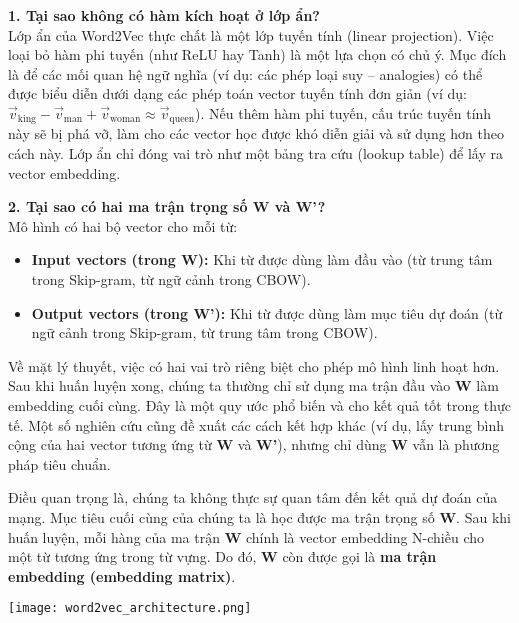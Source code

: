\begin{tcolorbox}[
    title=Ghi chú về Thiết kế Kiến trúc,
    colback=green!5!white, colframe=green!50!black, fonttitle=\bfseries
]
\textbf{1. Tại sao không có hàm kích hoạt ở lớp ẩn?} \\
Lớp ẩn của Word2Vec thực chất là một lớp tuyến tính (linear projection). Việc loại bỏ hàm phi tuyến (như ReLU hay Tanh) là một lựa chọn có chủ ý. Mục đích là để các mối quan hệ ngữ nghĩa (ví dụ: các phép loại suy -- analogies) có thể được biểu diễn dưới dạng các phép toán vector tuyến tính đơn giản (ví dụ: $\vec{v}_{\text{king}} - \vec{v}_{\text{man}} + \vec{v}_{\text{woman}} \approx \vec{v}_{\text{queen}}$). Nếu thêm hàm phi tuyến, cấu trúc tuyến tính này sẽ bị phá vỡ, làm cho các vector học được khó diễn giải và sử dụng hơn theo cách này. Lớp ẩn chỉ đóng vai trò như một bảng tra cứu (lookup table) để lấy ra vector embedding.

\textbf{2. Tại sao có hai ma trận trọng số W và W'?} \\
Mô hình có hai bộ vector cho mỗi từ:
\begin{itemize}
    \item \textbf{Input vectors (trong W):} Khi từ được dùng làm đầu vào (từ trung tâm trong Skip-gram, từ ngữ cảnh trong CBOW).
    \item \textbf{Output vectors (trong W'):} Khi từ được dùng làm mục tiêu dự đoán (từ ngữ cảnh trong Skip-gram, từ trung tâm trong CBOW).
\end{itemize}
Về mặt lý thuyết, việc có hai vai trò riêng biệt cho phép mô hình linh hoạt hơn. Sau khi huấn luyện xong, chúng ta thường chỉ sử dụng ma trận đầu vào \textbf{W} làm embedding cuối cùng. Đây là một quy ước phổ biến và cho kết quả tốt trong thực tế. Một số nghiên cứu cũng đề xuất các cách kết hợp khác (ví dụ, lấy trung bình cộng của hai vector tương ứng từ \textbf{W} và \textbf{W'}), nhưng chỉ dùng \textbf{W} vẫn là phương pháp tiêu chuẩn.
\end{tcolorbox}

Điều quan trọng là, chúng ta không thực sự quan tâm đến kết quả dự đoán của mạng. Mục tiêu cuối cùng của chúng ta là học được ma trận trọng số \textbf{W}. Sau khi huấn luyện, mỗi hàng của ma trận \textbf{W} chính là vector embedding N-chiều cho một từ tương ứng trong từ vựng. Do đó, \textbf{W} còn được gọi là \textbf{ma trận embedding (embedding matrix)}.

\begin{center}
    \texttt{[image: word2vec\_architecture.png]}
    \label{fig:word2vec_architecture}
\end{center}

